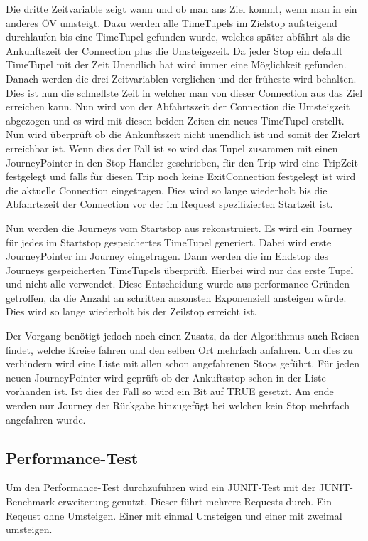 Die dritte Zeitvariable zeigt wann und ob man ans Ziel kommt, wenn man in ein anderes ÖV umsteigt. Dazu werden alle TimeTupels im Zielstop aufsteigend durchlaufen bis eine TimeTupel gefunden wurde, welches später abfährt als die Ankunftszeit der Connection plus die Umsteigezeit. Da jeder Stop ein default TimeTupel mit der Zeit Unendlich hat wird immer eine Möglichkeit gefunden. 
Danach werden die drei Zeitvariablen verglichen und der früheste wird behalten. Dies ist nun die schnellste Zeit in welcher man von dieser Connection aus das Ziel erreichen kann. Nun wird von der Abfahrtszeit der Connection die Umsteigzeit abgezogen und es wird mit diesen beiden Zeiten ein neues TimeTupel erstellt. Nun wird überprüft ob die Ankunftszeit nicht unendlich ist und somit der Zielort erreichbar ist. Wenn dies der Fall ist so wird das Tupel zusammen mit einen JourneyPointer in den Stop-Handler geschrieben, für den Trip wird eine TripZeit festgelegt und falls für diesen Trip noch keine ExitConnection festgelegt ist wird die aktuelle Connection eingetragen. Dies wird so lange wiederholt bis die Abfahrtszeit der Connection vor der im Request spezifizierten Startzeit ist.
\newline


Nun werden die Journeys vom Startstop aus rekonstruiert. Es wird ein Journey für jedes im Startstop gespeichertes TimeTupel generiert. Dabei wird erste JourneyPointer im Journey eingetragen. Dann werden die im Endstop des Journeys gespeicherten TimeTupels überprüft. Hierbei wird nur das erste Tupel und nicht alle verwendet. Diese Entscheidung wurde aus performance Gründen getroffen, da die Anzahl an schritten ansonsten Exponenziell ansteigen würde. Dies wird so lange wiederholt bis der Zeilstop erreicht ist. 
\newline


Der Vorgang benötigt jedoch noch einen Zusatz, da der Algorithmus auch Reisen findet, welche Kreise fahren und den selben Ort mehrfach anfahren. Um dies zu verhindern wird eine Liste mit allen schon angefahrenen Stops geführt. Für jeden neuen JourneyPointer wird geprüft ob der Ankuftsstop schon in der Liste vorhanden ist. Ist dies der Fall so wird ein Bit auf TRUE gesetzt. Am ende werden nur Journey der Rückgabe hinzugefügt bei welchen kein Stop mehrfach angefahren wurde.

\subsection{Performance-Test}
Um den Performance-Test durchzuführen wird ein JUNIT-Test mit der JUNIT-Benchmark erweiterung genutzt. Dieser führt mehrere Requests durch. Ein Reqeust ohne Umsteigen. Einer mit einmal Umsteigen und einer mit zweimal umsteigen.
\newline


